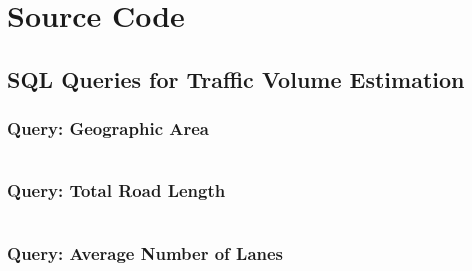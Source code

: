 \chapter{Source Code}
\label{appendix:source_code}

\section{SQL Queries for Traffic Volume Estimation}
\label{sec:appendix:source_code:traffic_volume}

\subsection{Query: Geographic Area}
\inputminted{sql}{97_listings/traffic_volume_1.sql}

\subsection{Query: Total Road Length}
\inputminted{sql}{97_listings/traffic_volume_2.sql}

\subsection{Query: Average Number of Lanes}
\inputminted{sql}{97_listings/traffic_volume_3.sql}